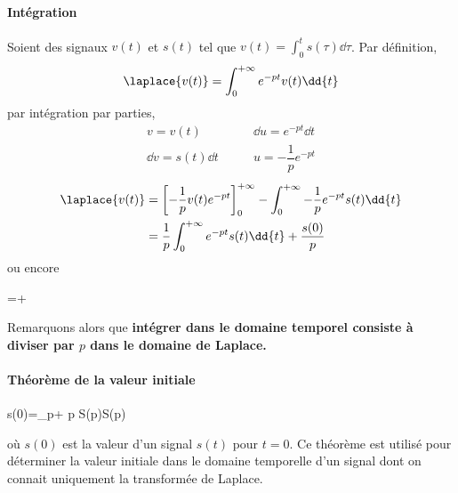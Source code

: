 \paragraph{Intégration}
Soient  des signaux $v(t)$ et $s(t)$ tel que 
$v(t)=\int_{0}^{t}s(\tau)\dd{\tau}$. Par définition,
\[
\laplace{v(t)}=\int_{0}^{+\infty} e^{-pt}v(t)\dd{t}
\]
par intégration par parties,
\begin{align*}
    v=v(t)\qquad&\dd{u}=e^{-pt}\dd{t}\\
    \dd{v}=s(t)\dd{t}\qquad&u=-\dfrac{1}{p}e^{-pt}
\end{align*} 
\begin{align*}
    \laplace{v(t)}&=\left[-\dfrac{1}{p}v(t)e^{-pt}\right]_0^{+\infty}
                          -\int_{0}^{+\infty}
                          -\dfrac{1}{p}e^{-pt}s(t)\dd{t} \\
    &=\dfrac{1}{p}\int_{0}^{+\infty} e^{-pt}s(t)\dd{t}+\dfrac{s(0)}{p}
\end{align*}
ou encore
\begin{bequation}
    =+
\end{bequation}
Remarquons alors que \textbf{intégrer dans le domaine temporel consiste à 
diviser par $p$ dans le domaine de Laplace.}

\paragraph{Théorème de la valeur initiale}
\begin{bequation}
    s(0)=\lim\limits_{p\rightarrow+\infty} p S(p)\qquad \forall S(p)
\end{bequation}
où $s(0)$ est la valeur d'un signal $s(t)$ pour $t=0$.
Ce théorème est utilisé pour déterminer la valeur initiale
dans le domaine temporelle d'un signal dont on connait 
uniquement la transformée de Laplace.
